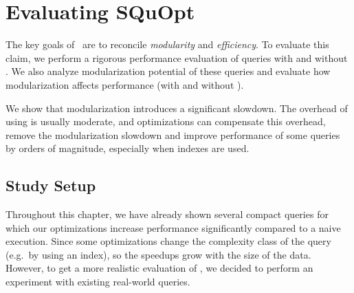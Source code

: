 \newcommand{\graphPath}[1]{aosd13/graphs/#1}

\chapter{Evaluating SQuOpt}
\label{sec:evaluation}

The key goals of \LoS\ are to reconcile \emph{modularity} and \emph{efficiency}. To evaluate this claim, we perform a rigorous performance evaluation of queries with and without \LoS{}. We also analyze modularization potential of these queries and evaluate how modularization affects performance (with and without \LoS{}).

We show that modularization introduces a significant slowdown. The overhead of
using \LoS{} is usually moderate, and optimizations can compensate this overhead, remove the
modularization slowdown and improve performance of some queries by orders of
magnitude, especially when indexes are used.


\section{Study Setup}
Throughout this chapter, we have already shown several compact queries for which our optimizations increase performance significantly compared to a naive execution. Since some optimizations change
the complexity class of the query (e.g.\ by using an index), so the speedups grow with the size of the data. However, to get a more realistic evaluation of \LoS{}, we decided to perform an experiment with existing real-world queries.

